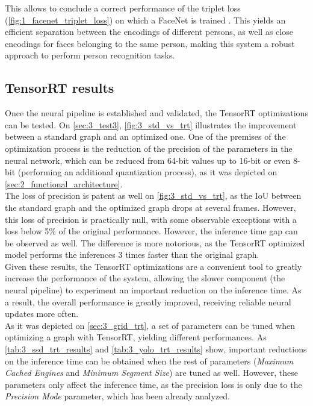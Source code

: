 This allows to conclude a correct performance of the triplet loss (\autoref{fig:1_facenet_triplet_loss}) on which a FaceNet is trained \cite{facenet}. This yields an efficient separation between the encodings of different persons, as well as close encodings for faces belonging to the same person, making this system a robust approach to perform person recognition tasks.\\


\subsection{TensorRT results}

Once the neural pipeline is established and validated, the TensorRT optimizations can be tested. On \autoref{sec:3_test3}, \autoref{fig:3_std_vs_trt} illustrates the improvement between a standard graph and an optimized one. One of the premises of the optimization process is the reduction of the precision of the parameters in the neural network, which can be reduced from 64-bit values up to 16-bit or even 8-bit (performing an additional quantization process), as it was depicted on \autoref{sec:2_functional_architecture}.\\

The loss of precision is patent as well on \autoref{fig:3_std_vs_trt}, as the IoU between the standard graph and the optimized graph drops at several frames. However, this loss of precision is practically null, with some observable exceptions with a loss below 5\% of the original performance. However, the inference time gap can be observed as well. The difference is more notorious, as the TensorRT optimized model performs the inferences 3 times faster than the original graph.\\

Given these results, the TensorRT optimizations are a convenient tool to greatly increase the performance of the system, allowing the slower component (the neural pipeline) to experiment an important reduction on the inference time. As a result, the overall performance is greatly improved, receiving reliable neural updates more often.\\

As it was depicted on \autoref{sec:3_grid_trt}, a set of parameters can be tuned when optimizing a graph with TensorRT, yielding different performances. As \autoref{tab:3_ssd_trt_results} and \autoref{tab:3_yolo_trt_results} show, important reductions on the inference time can be obtained when the rest of parameters (\textit{Maximum Cached Engines} and \textit{Minimum Segment Size}) are tuned as well. However, these parameters only affect the inference time, as the precision loss is only due to the \textit{Precision Mode} parameter, which has been already analyzed.\\

